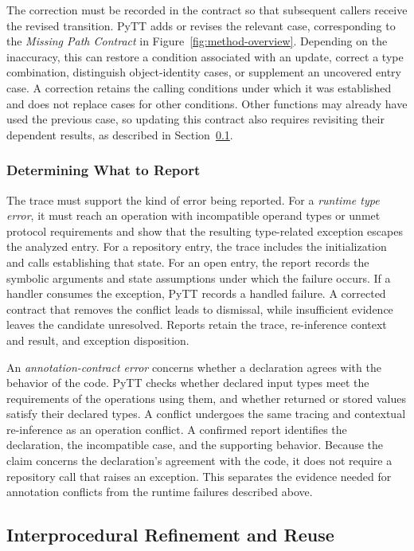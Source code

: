 The correction must be recorded in the contract so that subsequent
callers receive the revised transition. PyTT adds or revises the
relevant case, corresponding to the \emph{Missing Path Contract} in
Figure~\ref{fig:method-overview}. Depending on the inaccuracy, this can
restore a condition associated with an update, correct a type
combination, distinguish object-identity cases, or supplement an
uncovered entry case. A correction retains the calling conditions
under which it was established and does not replace cases for other
conditions. Other functions may already have used
the previous case, so updating this contract also requires revisiting
their dependent results, as described in Section~\ref{sec:reuse}.

\subsubsection{Determining What to Report}

The trace must support the kind of error being reported. For a
\emph{runtime type error}, it must reach an operation with incompatible
operand types or unmet protocol requirements and show that the resulting
type-related exception escapes the analyzed entry. For a repository
entry, the trace includes the initialization and calls establishing that
state. For an open entry, the report records the symbolic arguments and
state assumptions under which the failure occurs. If a handler consumes
the exception, PyTT records a handled failure. A corrected contract that
removes the conflict leads to dismissal, while insufficient evidence
leaves the candidate unresolved. Reports retain the trace, re-inference
context and result, and exception disposition.

An \emph{annotation-contract error} concerns whether a declaration agrees
with the behavior of the code. PyTT checks whether declared input types
meet the requirements of the operations using them, and whether returned
or stored values satisfy their declared types. A conflict undergoes the
same tracing and contextual re-inference as an operation conflict. A
confirmed report identifies the declaration, the incompatible case, and
the supporting behavior. Because the claim concerns the declaration's
agreement with the code, it does not require a repository call that
raises an exception. This separates the evidence needed for annotation
conflicts from the runtime failures described above.

\subsection{Interprocedural Refinement and Reuse}
\label{sec:reuse}

